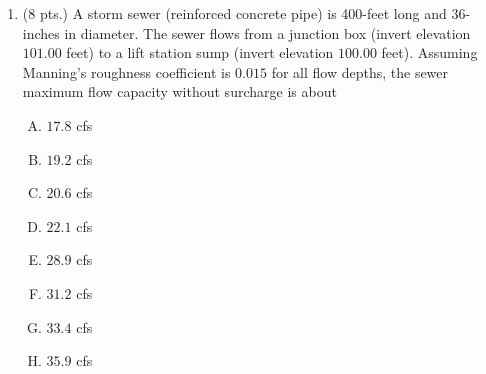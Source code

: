 \documentclass[11pt]{article}
\begin{document}
\begin{enumerate}
%
\item  (8 pts.)
A storm sewer (reinforced concrete pipe) is 400-feet long and 36-inches in diameter.  The sewer flows from a junction box (invert elevation $101.00$ feet) to a lift station sump (invert elevation $100.00$ feet).  Assuming Manning's roughness coefficient is $0.015$ for all flow depths, the sewer maximum flow capacity without surcharge is about
\begin{enumerate} [(A)]
\item  $17.8$ cfs
\item  $19.2$ cfs
\item  $20.6$ cfs
\item  $22.1$ cfs
\item  $28.9$ cfs
\item  $31.2$ cfs
\item  $33.4$ cfs
\item  $35.9$ cfs
\end{enumerate}



\end{enumerate}
\end{document}
